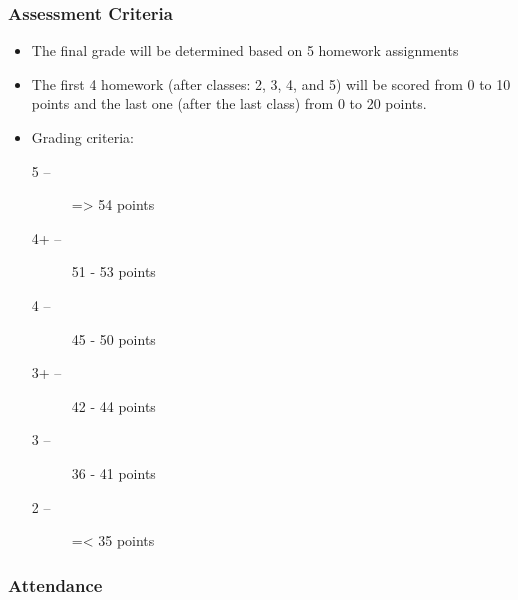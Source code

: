 \documentclass{beamer}
\begin{document}
\begin{frame}
    \frametitle{Assessment Criteria}
    \begin{itemize}
        \item The final grade will be determined based on \alert{5 homework
        assignments}
        \item The first 4 homework (after classes: 2, 3, 4, and 5) will be scored from 0 to 10 points and the
        last one (after the last class) from 0 to 20 points.
        \item Grading criteria:
    \begin{description}
        \item [5\phantom{+} --] => 54 points
        \item [4+ --] 51 - 53 points
        \item [4\phantom{+} --] 45 - 50 points
        \item [3+ --] 42 - 44 points
        \item [3\phantom{+} --] 36 - 41 points
        \item [2\phantom{+} --] =< 35 points
    \end{description}
\end{itemize}
\end{frame}
\begin{frame}
    \frametitle{Attendance}
\end{frame}
\end{document}
